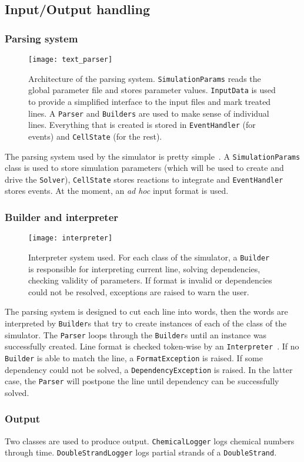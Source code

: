 
\subsection{Input/Output handling}

\subsubsection{Parsing system}

\begin{figure}[!h]
  \centering
  \texttt{[image: text\_parser]}
  \caption{Architecture of the parsing system.
  \texttt{SimulationParams} reads the global parameter file and stores parameter values.
  \texttt{InputData} is used to provide a simplified interface to the input files
  and mark treated lines.
  A \texttt{Parser} and \texttt{Builders} are used to make sense of individual lines.
  Everything that is created is stored in \texttt{EventHandler} (for events) and \texttt{CellState} (for the rest).
  }
\label{fig:text_parser}
\end{figure}

The parsing system used by the simulator is pretty simple~.
A \texttt{SimulationParams} class is used to store simulation parameters
(which will be used to create and drive the \texttt{Solver}),
\texttt{CellState} stores reactions to integrate and \texttt{EventHandler} stores events.
At the moment, an \textit{ad hoc} input format is used.


\subsubsection{Builder and interpreter}

\begin{figure}[!h]
  \centering
  \texttt{[image: interpreter]}
  \caption{Interpreter system used.
  For each class of the simulator, a \texttt{Builder} is responsible for interpreting current line,
  solving dependencies, checking validity of parameters.
  If format is invalid or dependencies could not be resolved,
  exceptions are raised to warn the user.}
\label{fig:interpreter}
\end{figure}

The parsing system is designed to cut each line into words,
then the words are interpreted by \texttt{Builder}s that try to create instances
of each of the class of the simulator.
The \texttt{Parser} loops through the \texttt{Builder}s
until an instance was successfully created.
Line format is checked token-wise by an \texttt{Interpreter}~.
If no \texttt{Builder} is able to match the line, a \texttt{FormatException} is raised.
If some dependency could not be solved, a \texttt{DependencyException} is raised.
In the latter case, the \texttt{Parser} will postpone the line until dependency can be successfully solved.


\subsubsection{Output}

Two classes are used to produce output.
\texttt{ChemicalLogger} logs chemical numbers through time.
\texttt{DoubleStrandLogger} logs partial strands of a \texttt{DoubleStrand}.
